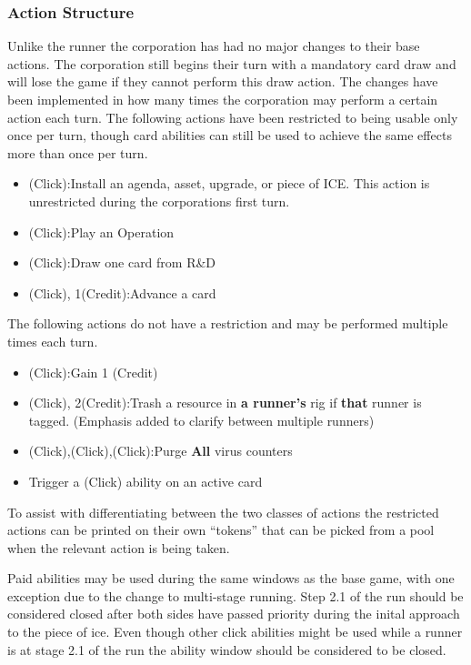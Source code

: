 \documentclass[titlepage]{article}
\begin{document}
		\subsubsection{Action Structure}

			Unlike the runner the corporation has had no major changes to their base actions. The corporation still begins their turn with a mandatory card draw and will lose the game if they cannot perform this draw action. The changes have been implemented in how many times the corporation may perform a certain action each turn. The following actions have been restricted to being usable only once per turn, though card abilities can still be used to achieve the same effects more than once per turn.
			\begin{itemize}
				\item (Click):Install an agenda, asset, upgrade, or piece of ICE. This action is unrestricted during the corporations first turn.
				\item (Click):Play an Operation
				\item (Click):Draw one card from R\&D
				\item (Click), 1(Credit):Advance a card
			\end{itemize}

			The following actions do not have a restriction and may be performed multiple times each turn.

			\begin{itemize}
				\item (Click):Gain 1 (Credit)
				\item (Click), 2(Credit):Trash a resource in \textbf{a runner's} rig if \textbf{that} runner is tagged. (Emphasis added to clarify between multiple runners)
				\item (Click),(Click),(Click):Purge \textbf{All} virus counters
				\item Trigger a (Click) ability on an active card
			\end{itemize}

			To assist with differentiating between the two classes of actions the restricted actions can be printed on their own ``tokens'' that can be picked from a pool when the relevant action is being taken.

			Paid abilities may be used during the same windows as the base game, with one exception due to the change to multi-stage running. Step 2.1 of the run should be considered closed after both sides have passed priority during the inital approach to the piece of ice. Even though other click abilities might be used while a runner is at stage 2.1 of the run the ability window should be considered to be closed.
\end{document}

